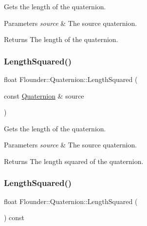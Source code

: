 Gets the length of the quaternion. 


\begin{DoxyParams}{Parameters}
{\em source} & The source quaternion. \\
\hline
\end{DoxyParams}
\begin{DoxyReturn}{Returns}
The length of the quaternion. 
\end{DoxyReturn}
\mbox{\label{class_flounder_1_1_quaternion_a84c494c718ef878c45ec14c9790ba49d}} 
\subsubsection{\texorpdfstring{Length\+Squared()}{LengthSquared()}\hspace{0.1cm}{\footnotesize\ttfamily [1/2]}}
{\footnotesize\ttfamily float Flounder\+::\+Quaternion\+::\+Length\+Squared (\begin{DoxyParamCaption}\item[{const \hyperlink{class_flounder_1_1_quaternion}{Quaternion} \&}]{source }\end{DoxyParamCaption})\hspace{0.3cm}{\ttfamily [static]}}



Gets the length of the quaternion. 


\begin{DoxyParams}{Parameters}
{\em source} & The source quaternion. \\
\hline
\end{DoxyParams}
\begin{DoxyReturn}{Returns}
The length squared of the quaternion. 
\end{DoxyReturn}
\mbox{\label{class_flounder_1_1_quaternion_ae665911fb0dcf31a75c462c7ea80ae58}} 
\subsubsection{\texorpdfstring{Length\+Squared()}{LengthSquared()}\hspace{0.1cm}{\footnotesize\ttfamily [2/2]}}
{\footnotesize\ttfamily float Flounder\+::\+Quaternion\+::\+Length\+Squared (\begin{DoxyParamCaption}{ }\end{DoxyParamCaption}) const}



